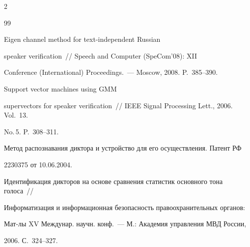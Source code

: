 \begin{multicols}{2}
{{\begin{thebibliography}{99}


   Eigen channel method for text-independent Russian 


speaker verification~// Speech and Computer (SpeCom'08): XII 


 Conference (International) Proceedings.~--- Moscow, 2008. P.~385--390.


  




   Support vector machines using GMM 


supervectors for speaker verification~// IEEE Signal Processing Lett., 2006. Vol.~13. 


No.\,5. P.~308--311.









  Метод распознавания диктора и устройство для его осуществления. Патент РФ 


2230375 от 10.06.2004.





\label{end\stat}


  






Идентификация дикторов на основе сравнения статистик основного тона голоса~// 


Информатизация и информационная безопасность правоохранительных органов: 


Мат-лы XV Междунар. научн. конф.~--- М.: Академия управления МВД России, 


2006. С.~324--327. 


 \end{thebibliography}


}


}








\end{multicols}       


